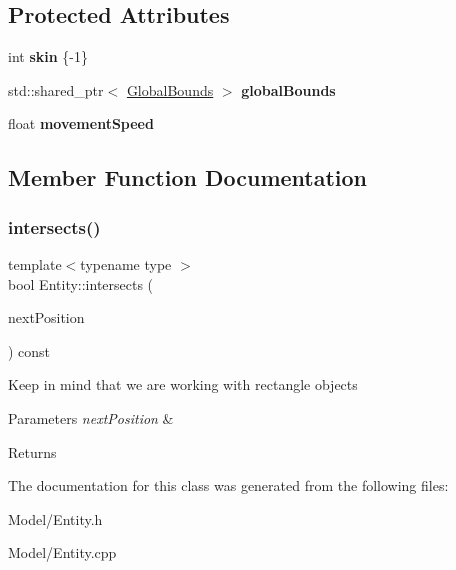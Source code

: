 \subsection*{Protected Attributes}
\begin{DoxyCompactItemize}
\item 
\mbox{\label{class_entity_a153419f3400cd95918a437083b371eb3}} 
int {\bfseries skin} \{-\/1\}
\item 
\mbox{\label{class_entity_ae604454cbac259c1229a0a142d4c02d0}} 
std\+::shared\+\_\+ptr$<$ \hyperlink{struct_global_bounds}{Global\+Bounds} $>$ {\bfseries global\+Bounds}
\item 
\mbox{\label{class_entity_ac28cd407994c232f1b71c886bb9aa584}} 
float {\bfseries movement\+Speed}
\end{DoxyCompactItemize}


\subsection{Member Function Documentation}
\mbox{\label{class_entity_a6dcfeadddb85cce9f5352b6553ab404b}} 
\subsubsection{\texorpdfstring{intersects()}{intersects()}}
{\footnotesize\ttfamily template$<$typename type $>$ \\
bool Entity\+::intersects (\begin{DoxyParamCaption}\item[{const std\+::shared\+\_\+ptr$<$ \hyperlink{struct_global_bounds}{Global\+Bounds} $>$ \&}]{next\+Position }\end{DoxyParamCaption}) const\hspace{0.3cm}{\ttfamily [inline]}}

Keep in mind that we are working with rectangle objects 
\begin{DoxyParams}{Parameters}
{\em next\+Position} & \\
\hline
\end{DoxyParams}
\begin{DoxyReturn}{Returns}

\end{DoxyReturn}


The documentation for this class was generated from the following files\+:\begin{DoxyCompactItemize}
\item 
Model/Entity.\+h\item 
Model/Entity.\+cpp\end{DoxyCompactItemize}
